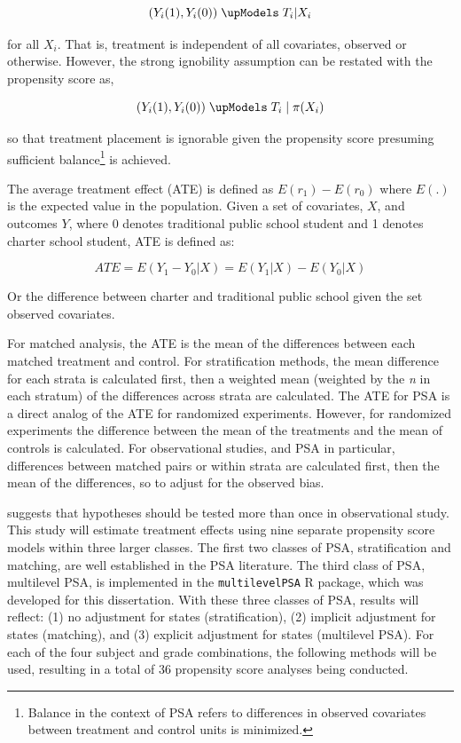 \documentclass[letterpaper,12p,twoside]{article} %
\begin{document}
\begin{equation}
({ Y }_{ i }(1),{ Y }_{ i }(0)) \; \upModels \; { T }_{ i }|{ X }_{ i }
\end{equation}

\noindent for all ${X}_{i}$. That is, treatment is independent of all covariates, observed or otherwise. However, the strong ignobility assumption can be restated with the propensity score as,

\begin{equation}
({ Y }_{ i }(1),{ Y }_{ i }(0)) \; \upModels \; { T }_{ i } \; | \; \pi({ X }_{ i })
\end{equation}

\noindent so that treatment placement is ignorable given the propensity score presuming sufficient balance\footnote{Balance in the context of PSA refers to differences in observed covariates between treatment and control units is minimized.} is achieved.

The average treatment effect (ATE) is defined as $E(r_1) - E(r_0)$ where $E(.)$ is the expected value in the population. Given a set of covariates, $X$, and outcomes $Y$, where 0 denotes traditional public school student and 1 denotes charter school student, ATE is defined as:

\begin{equation}
ATE=E(Y_{1}-Y_{0}|X)=E(Y_{1}|X)-E(Y_{0}|X)
\end{equation}
 
\noindent Or the difference between charter and traditional public school given the set observed covariates.

For matched analysis, the ATE is the mean of the differences between each matched treatment and control. For stratification methods, the mean difference for each strata is calculated first, then a weighted mean (weighted by the \textit{n} in each stratum) of the differences across strata are calculated. The ATE for PSA is a direct analog of the ATE for randomized experiments. However, for randomized experiments the difference between the mean of the treatments and the mean of controls is calculated. For observational studies, and PSA in particular, differences between matched pairs or within strata are calculated first, then the mean of the differences, so to adjust for the observed bias.

 suggests that hypotheses should be tested more than once in observational study. This study will estimate treatment effects using nine separate propensity score models within three larger classes. The first two classes of PSA, stratification and matching, are well established in the PSA literature. The third class of PSA, multilevel PSA, is implemented in the \texttt{multilevelPSA} R package, which was developed for this dissertation. With these three classes of PSA, results will reflect: (1) no adjustment for states (stratification), (2) implicit adjustment for states (matching), and (3) explicit adjustment for states (multilevel PSA). For each of the four subject and grade combinations, the following methods will be used, resulting in a total of 36 propensity score analyses being conducted.
\end{document}
